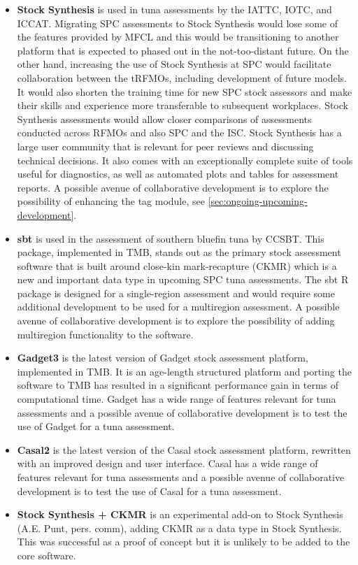 \documentclass{SCreport}
\begin{document}
\begin{itemize}
  \item \textbf{Stock Synthesis} is used in tuna assessments by the IATTC, IOTC,
  and ICCAT. Migrating SPC assessments to Stock Synthesis would lose some of the
  features provided by MFCL and this would be transitioning to another platform
  that is expected to phased out in the \mbox{not-too-distant} future. On the
  other hand, increasing the use of Stock Synthesis at SPC would facilitate
  collaboration between the tRFMOs, including development of future models. It
  would also shorten the training time for new SPC stock assessors and make
  their skills and experience more transferable to subsequent workplaces. Stock
  Synthesis assessments would allow closer comparisons of assessments conducted
  across RFMOs and also SPC and the ISC. Stock Synthesis has a large user
  community that is relevant for peer reviews and discussing technical
  decisions. It also comes with an exceptionally complete suite of tools useful
  for diagnostics, as well as automated plots and tables for assessment reports.
  A possible avenue of collaborative development is to explore the possibility
  of enhancing the tag module, see \autoref{sec:ongoing-upcoming-development}.
  \item \textbf{sbt} is used in the assessment of southern bluefin tuna by
  CCSBT. This package, implemented in TMB, stands out as the primary stock
  assessment software that is built around close-kin mark-recapture (CKMR) which
  is a new and important data type in upcoming SPC tuna assessments. The
  \textsf{sbt} R package is designed for a single-region assessment and would
  require some additional development to be used for a multiregion assessment. A
  possible avenue of collaborative development is to explore the possibility of
  adding multiregion functionality to the software.
  \item \textbf{Gadget3} is the latest version of Gadget stock assessment
  platform, implemented in TMB. It is an age-length structured platform and
  porting the software to TMB has resulted in a significant performance gain in
  terms of computational time. Gadget has a wide range of features relevant for
  tuna assessments and a possible avenue of collaborative development is to test
  the use of Gadget for a tuna assessment.
  \item \textbf{Casal2} is the latest version of the Casal stock assessment
  platform, rewritten with an improved design and user interface. Casal has a
  wide range of features relevant for tuna assessments and a possible avenue of
  collaborative development is to test the use of Casal for a tuna assessment.
  \item \textbf{Stock Synthesis + CKMR} is an experimental add-on to Stock
  Synthesis (A.E. Punt, pers. comm), adding CKMR as a data type in Stock
  Synthesis. This was successful as a proof of concept but it is unlikely to be
  added to the core software.
\end{itemize}
\end{document}
